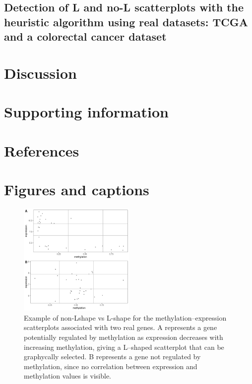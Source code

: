 \documentclass[10pt,letterpaper]{article}
\begin{document}
\hypertarget{detection-of-l-and-no-l-scatterplots-with-the-heuristic-algorithm-using-real-datasets-tcga-and-a-colorectal-cancer-dataset}{%
\subsection{Detection of L and no-L scatterplots with the heuristic
algorithm using real datasets: TCGA and a colorectal cancer
dataset}\label{detection-of-l-and-no-l-scatterplots-with-the-heuristic-algorithm-using-real-datasets-tcga-and-a-colorectal-cancer-dataset}}

\hypertarget{discussion}{%
\section{Discussion}\label{discussion}}

\hypertarget{supporting-information}{%
\section{Supporting information}\label{supporting-information}}

\hypertarget{references}{%
\section*{References}\label{references}}

\clearpage

\hypertarget{figures-and-captions}{%
\section{Figures and captions}\label{figures-and-captions}}

\begin{figure}
\hypertarget{id}{%
\centering
\includegraphics[width=0.5\textwidth,height=0.5\textheight]{figures/Figure1.png}
\caption{Example of non-Lshape vs L-shape for the
methylation--expression scatterplots associated with two real genes. A
represents a gene potentially regulated by methylation as expression
decreases with increasing methylation, giving a L--shaped scatterplot
that can be graphycally selected. B represents a gene not regulated by
methylation, since no correlation between expression and methylation
values is visible.}\label{id}
}
\end{figure}
\end{document}
